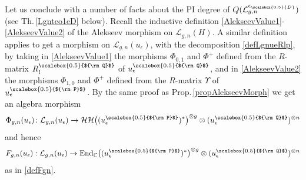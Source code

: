 \documentclass[11pt]{amsart}
\newcommand{\e}{\epsilon}
\newcommand{\mc}{\mathbb{C}}
\newcommand{\Hh}{\mathcal{H}}
\newcommand{\Ll}{\mathcal{L}}
\newcommand{\eD}{\epsilon_{\scalebox{0.5}{D}}}
\newcommand{\Q}{{\scalebox{0.5}{${\rm Q}$}}}
\newcommand{\Pup}{{\scalebox{0.5}{${\rm P}$}}}
\begin{document}
\indent Let us conclude with a number of facts about the PI degree of $Q(\mathcal{L}_{g,n}^{\eD})$ (see Th.\,\ref{Lgnteo1eD} below). Recall the inductive definition \eqref{AlekseevValue1}-\eqref{AlekseevValue2} of the Alekseev morphism on $\Ll_{g,n}(H)$. A similar definition applies to get a morphism on $\mathcal{L}_{g,n}(u_\e)$, with the decomposition \eqref{defLgnueRlp}, by taking in \eqref{AlekseevValue1} the morphisms $\Phi_{0,1}$ and $\Phi^+$ defined from the $R$-matrix $R_l^\Q$ of $u_\e^\Q$, and in \eqref{AlekseevValue2} the morphisms $\Phi_{1,0}$ and $\Phi^+$ defined from the $R$-matrix $\Upsilon$ of $u_\e^\Pup$. By the same proof as Prop.\,\ref{propAlekseevMorph} we get an algebra morphism $$\Phi_{g,n}(u_\e) \colon \mathcal{L}_{g,n}(u_\e) \to \Hh\Hh\bigl((u_\e^\Pup)^*\bigr)^{\otimes g}\otimes (u_\e^\Q)^{\otimes n}$$
and hence
$$F_{g,n}(u_\e) : \mathcal{L}_{g,n}(u_\e) \to \mathrm{End}_\mc\bigl((u_\e^\Pup)^*\bigr)^{\otimes g} \otimes (u_\e^\Q)^{\otimes n}$$ as in \eqref{defFgn}.
\end{document}
